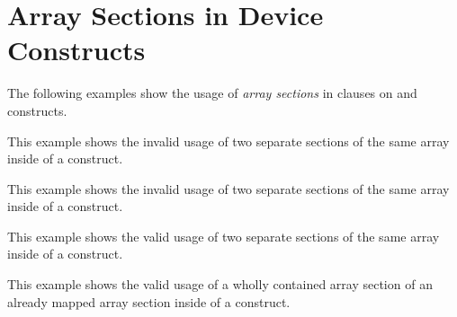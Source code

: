 \section{Array Sections in Device Constructs}
\label{sec:array_sections}

The following examples show the usage of \emph{array sections} in  clauses 
on  and  constructs.

This example shows the invalid usage of two separate sections of the same array 
inside of a  construct.



This example shows the invalid usage of two separate sections of the same array 
inside of a  construct.



This example shows the valid usage of two separate sections of the same array inside 
of a  construct.



This example shows the valid usage of a wholly contained array section of an already 
mapped array section inside of a  construct.



